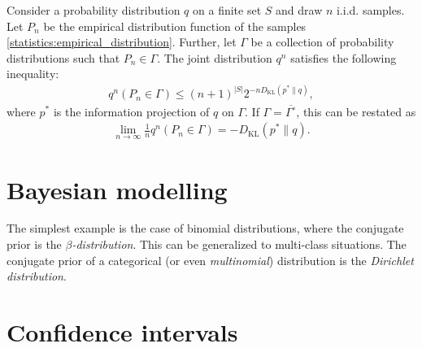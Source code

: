     \begin{theorem}[Sanov]
        Consider a probability distribution $q$ on a finite set $S$ and draw $n$ i.i.d. samples. Let $P_n$ be the empirical distribution function of the samples \eqref{statistics:empirical_distribution}. Further, let $\Gamma$ be a collection of probability distributions such that $P_n\in\Gamma$. The joint distribution $q^n$ satisfies the following inequality:
        \begin{gather}
            q^n(P_n\in\Gamma) \leq (n+1)^{|S|}2^{-n D_\mathrm{KL}(p^*\|q)},
        \end{gather}
        where $p^*$ is the information projection of $q$ on $\Gamma$. If $\Gamma=\overline{\Gamma^\circ}$, this can be restated as
        \begin{gather}
            \lim_{n\rightarrow\infty}\frac{1}{n}q^n(P_n\in\Gamma) = - D_\mathrm{KL}(p^*\|q).
        \end{gather}
    \end{theorem}

\section{Bayesian modelling}

    \begin{example}
        The simplest example is the case of binomial distributions, where the conjugate prior is the \textit{$\beta$-distribution}. This can be generalized to multi-class situations. The conjugate prior of a categorical (or even \textit{multinomial}) distribution is the \textit{Dirichlet distribution}.
    \end{example}

\section{Confidence intervals}\label{section:confidence}

